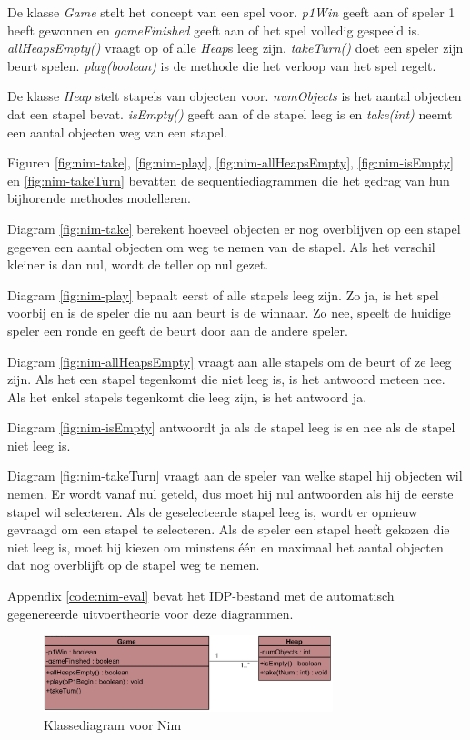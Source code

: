De klasse \textit{Game} stelt het concept van een spel voor. \textit{p1Win} geeft aan of speler 1 heeft gewonnen en \textit{gameFinished} geeft aan of het spel volledig gespeeld is. \textit{allHeapsEmpty()} vraagt op of alle \textit{Heap}s leeg zijn. \textit{takeTurn()} doet een speler zijn beurt spelen. \textit{play(boolean)} is de methode die het verloop van het spel regelt.

De klasse \textit{Heap} stelt stapels van objecten voor. \textit{numObjects} is het aantal objecten dat een stapel bevat. \textit{isEmpty()} geeft aan of de stapel leeg is en \textit{take(int)} neemt een aantal objecten weg van een stapel.

Figuren \ref{fig:nim-take}, \ref{fig:nim-play}, \ref{fig:nim-allHeapsEmpty}, \ref{fig:nim-isEmpty} en \ref{fig:nim-takeTurn} bevatten de sequentiediagrammen die het gedrag van hun bijhorende methodes modelleren.

Diagram \ref{fig:nim-take} berekent hoeveel objecten er nog overblijven op een stapel gegeven een aantal objecten om weg te nemen van de stapel. Als het verschil kleiner is dan nul, wordt de teller op nul gezet.

Diagram \ref{fig:nim-play} bepaalt eerst of alle stapels leeg zijn. Zo ja, is het spel voorbij en is de speler die nu aan beurt is de winnaar. Zo nee, speelt de huidige speler een ronde en geeft de beurt door aan de andere speler.

Diagram \ref{fig:nim-allHeapsEmpty} vraagt aan alle stapels om de beurt of ze leeg zijn. Als het een stapel tegenkomt die niet leeg is, is het antwoord meteen nee. Als het enkel stapels tegenkomt die leeg zijn, is het antwoord ja.

Diagram \ref{fig:nim-isEmpty} antwoordt ja als de stapel leeg is en nee als de stapel niet leeg is.

Diagram \ref{fig:nim-takeTurn} vraagt aan de speler van welke stapel hij objecten wil nemen. Er wordt vanaf nul geteld, dus moet hij nul antwoorden als hij de eerste stapel wil selecteren. Als de geselecteerde stapel leeg is, wordt er opnieuw gevraagd om een stapel te selecteren. Als de speler een stapel heeft gekozen die niet leeg is, moet hij kiezen om minstens \'e\'en en maximaal het aantal objecten dat nog overblijft op de stapel weg te nemen.

Appendix \ref{code:nim-eval} bevat het IDP-bestand met de automatisch gegenereerde uitvoertheorie voor deze diagrammen.

\begin{figure}[htp]
	\centering
	\includegraphics[width=0.75\textwidth]{chap-evaluatie/ClassDiagram1.png}
	\caption{Klassediagram voor Nim}
	\label{fig:nim-cd}
\end{figure}

